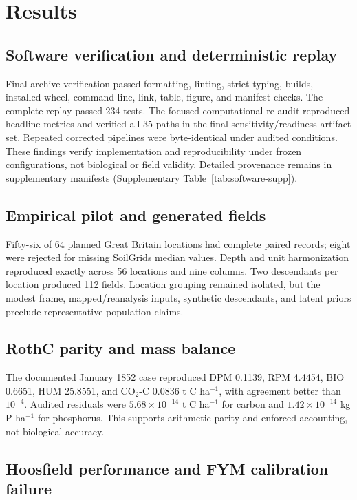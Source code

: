 \documentclass[11pt]{article}
\newcommand{\unitC}{t C ha$^{-1}$}
\newcommand{\unitP}{kg P ha$^{-1}$}
\begin{document}
\section{Results}

\subsection{Software verification and deterministic replay}

Final archive verification passed formatting, linting, strict typing, builds, installed-wheel, command-line, link, table, figure, and manifest checks. The complete replay passed 234 tests. The focused computational re-audit reproduced headline metrics and verified all 35 paths in the final sensitivity/readiness artifact set. Repeated corrected pipelines were byte-identical under audited conditions. These findings verify implementation and reproducibility under frozen configurations, not biological or field validity. Detailed provenance remains in supplementary manifests (Supplementary Table~\ref{tab:software-supp}).

\subsection{Empirical pilot and generated fields}

Fifty-six of 64 planned Great Britain locations had complete paired records; eight were rejected for missing SoilGrids median values. Depth and unit harmonization reproduced exactly across 56 locations and nine columns. Two descendants per location produced 112 fields. Location grouping remained isolated, but the modest frame, mapped/reanalysis inputs, synthetic descendants, and latent priors preclude representative population claims.

\subsection{RothC parity and mass balance}

The documented January 1852 case reproduced DPM 0.1139, RPM 4.4454, BIO 0.6651, HUM 25.8551, and CO$_2$-C 0.0836 \unitC{}, with agreement better than $10^{-4}$. Audited residuals were $5.68\times10^{-14}$ \unitC{} for carbon and $1.42\times10^{-14}$ \unitP{} for phosphorus. This supports arithmetic parity and enforced accounting, not biological accuracy.

\subsection{Hoosfield performance and FYM calibration failure}
\end{document}

